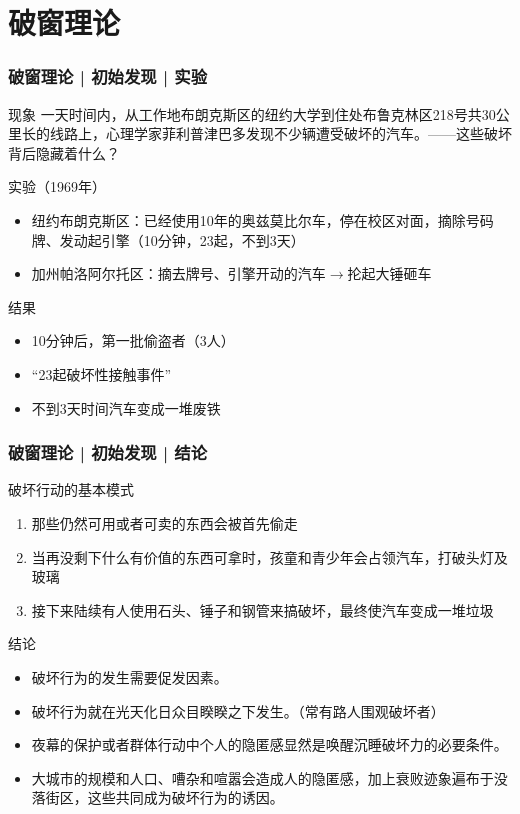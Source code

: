 \section{破窗理论}
\begin{frame}
  \frametitle{破窗理论 | 初始发现 | 实验}
  \vspace{-0.5em}
  \begin{block}{现象}
一天时间内，从工作地布朗克斯区的纽约大学到住处布鲁克林区218号共30公里长的线路上，心理学家菲利普\textbullet 津巴多发现不少辆遭受破坏的汽车。——这些破坏背后隐藏着什么？
  \end{block}
  \pause
  \begin{block}{实验（1969年）}
    \begin{itemize}
      \item 纽约布朗克斯区：已经使用10年的奥兹莫比尔车，停在校区对面，摘除号码牌、发动起引擎（10分钟，23起，不到3天）
      \item 加州帕洛阿尔托区：摘去牌号、引擎开动的汽车$\longrightarrow$抡起大锤砸车
    \end{itemize}
  \end{block}
  \begin{block}{结果}
    \begin{itemize}
      \item 10分钟后，第一批偷盗者（3人）
      \item “23起破坏性接触事件”
      \item 不到3天时间汽车变成一堆废铁
    \end{itemize}
  \end{block}
\end{frame}

\begin{frame}
  \frametitle{破窗理论 | 初始发现 | 结论}
  \begin{block}{破坏行动的基本模式}
    \begin{enumerate}
      \item 那些仍然可用或者可卖的东西会被首先偷走
      \item 当再没剩下什么有价值的东西可拿时，孩童和青少年会占领汽车，打破头灯及玻璃
      \item 接下来陆续有人使用石头、锤子和钢管来搞破坏，最终使汽车变成一堆垃圾
    \end{enumerate}
  \end{block}
  \pause
  \begin{block}{结论}
    \begin{itemize}
      \item 破坏行为的发生需要促发因素。
      \item 破坏行为就在光天化日众目睽睽之下发生。（常有路人围观破坏者）
      \item 夜幕的保护或者群体行动中个人的隐匿感显然是唤醒沉睡破坏力的必要条件。
      \item 大城市的规模和人口、嘈杂和喧嚣会造成人的隐匿感，加上衰败迹象遍布于没落街区，这些共同成为破坏行为的诱因。
    \end{itemize}
  \end{block}
\end{frame}

